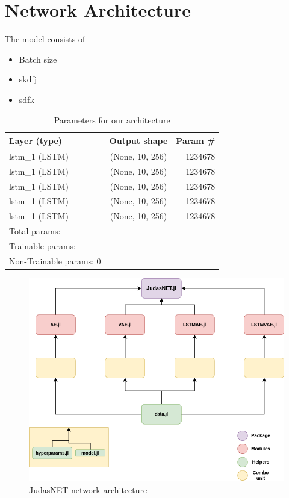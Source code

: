 \section{Network Architecture}

The model consists of

\begin{itemize}
    \item Batch size 
    \item skdfj
    \item sdfk
\end{itemize}

\begin{table}[h]
    \centering
    \begin{tabular}{ l c r }
      \hline
      Layer (type) & Output shape & Param \# \\ \hline
      lstm\_1 (LSTM) & (None, 10, 256) & 1234678 \\ \hline
      lstm\_1 (LSTM) & (None, 10, 256) & 1234678 \\ \hline
      lstm\_1 (LSTM) & (None, 10, 256) & 1234678 \\ \hline
      lstm\_1 (LSTM) & (None, 10, 256) & 1234678 \\ \hline
      lstm\_1 (LSTM) & (None, 10, 256) & 1234678 \\ \hline
      Total params: & & \\
      Trainable params: & & \\ 
      Non-Trainable params: 0 & & \\ \hline
      
    \end{tabular}
    \caption{Parameters for our architecture}
    \label{tab:archparams}
\end{table}


\begin{figure}[h]
    \centering
    \includegraphics{figures/judasnet.png}
    \caption{JudasNET network architecture}
    \label{fig:judasnet}
\end{figure}


